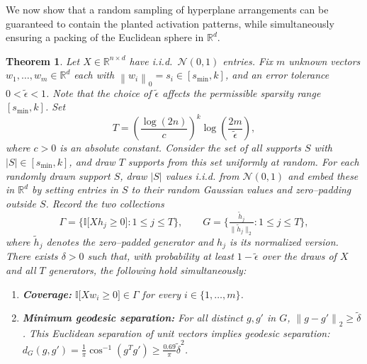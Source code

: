 \documentclass{article} %
\newcommand{\zeronorm}[1]{\left\|#1\right\|_{0}}
\newcommand{\twonorm}[1]{\left\|#1\right\|_{2}}
\newcommand{\n}{\ensuremath{n}}
\newcommand{\m}{\ensuremath{m}}
\newcommand{\datadim}{\ensuremath{d}}
\newcommand{\X}{\ensuremath{X}}
\newcommand{\w}{\ensuremath{w}}
\newcommand{\h}{\ensuremath{h}}
\newtheorem{theorem}{Theorem}
\newcommand{\1}{\ensuremath{{\sf (i)}}}
\newcommand{\2}{\ensuremath{{\sf (ii)}}}
\newcommand{\3}{\ensuremath{{\sf (iii)}}}
\newcommand{\4}{\ensuremath{{\sf (iv)}}}
\newcommand{\5}{\ensuremath{{\sf (v)}}}
\newcommand{\6}{\ensuremath{{\sf (vi)}}}
\newcommand{\R}{\mathbb{R}}
\begin{document}
We now show that a random sampling of hyperplane arrangements can be guaranteed to contain the planted activation patterns, while simultaneously ensuring a packing of the Euclidean sphere in $\R^{\datadim}$.
\begin{theorem}
Let \(\X \in \R^{\n \times \datadim}\) have i.i.d.\ \(\mathcal{N}(0,1)\) entries.
Fix \(\m\) unknown 
vectors \(\w_{1},\dots ,\w_{\m} \in \R^{\datadim}\) each with $\zeronorm{\w_i} = s_i \in [s_\text{min}, k]$,
and an error tolerance \(0 < \tilde\epsilon < 1\). Note that the choice of $\tilde\epsilon$ affects the permissible sparsity range $[s_\text{min}, k]$.
Set
\[
T = \left( \frac{\log(2\n)}{c} \right)^k \log\left(\frac{2\m}{\tilde\epsilon} \right) ,
\]
where \(c>0\) is an absolute constant.
Consider the set of all supports $S$ with $|S| \in [s_\text{min}, k]$, and draw $T$ supports from this set uniformly at random.
For each randomly drawn support $S$, draw $|S|$ values i.i.d. from $\mathcal{N}(0,1)$ and embed these in \(\R^{\datadim}\) by setting entries in $S$ to their random Gaussian values and zero–padding outside \(S\).
Record the two collections
\[
\Gamma
=
\bigl\{
      \mathbb{I}\!\bigl[\X\h_{j} \ge 0\bigr]
      : 1 \le j \le T
\bigr\},
\qquad
G
=
\bigl\{
      \tfrac{\widetilde{\h}_{j}}{\lVert \widetilde{\h}_{j} \rVert_{2}}
      : 1 \le j \le T
\bigr\},
\]
where 
\(\widetilde{\h}_{j}\) 
denotes the zero–padded generator and $\h_j$ is its normalized version.
There exists \(\delta>0\) such that, with probability at least
\(1-\tilde\epsilon\) over the draws of \(\X\) and all $T$ generators, the following hold simultaneously:
\begin{enumerate}
\item
\textbf{Coverage:}
\(
\mathbb{I}\!\bigl[\X \w_{i} \ge 0\bigr] \in \Gamma
\)
for every \(i \in \{1,\dots ,\m\}\).
\item
\textbf{Minimum geodesic separation:}
For all distinct $g, g'$ in $G$, $\twonorm{g - g'} \geq \tilde\delta$.
This Euclidean separation of unit vectors implies geodesic separation: $d_G(g, g') = \frac{1}{\pi}\cos^{-1}(g^Tg') \geq \frac{0.69}{\pi}\tilde\delta^2$.
\end{enumerate}
\end{theorem}
\end{document}
